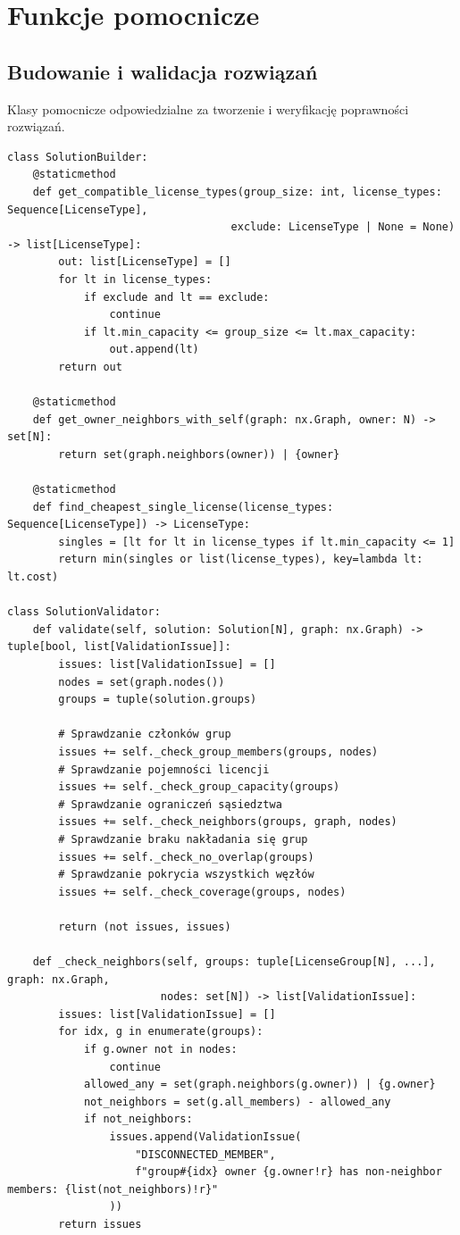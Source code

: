 \section{Funkcje pomocnicze}
\subsection{Budowanie i walidacja rozwiązań}
Klasy pomocnicze odpowiedzialne za tworzenie i weryfikację poprawności rozwiązań.

{\footnotesize
\begin{verbatim}
class SolutionBuilder:
    @staticmethod
    def get_compatible_license_types(group_size: int, license_types: Sequence[LicenseType],
                                   exclude: LicenseType | None = None) -> list[LicenseType]:
        out: list[LicenseType] = []
        for lt in license_types:
            if exclude and lt == exclude:
                continue
            if lt.min_capacity <= group_size <= lt.max_capacity:
                out.append(lt)
        return out

    @staticmethod
    def get_owner_neighbors_with_self(graph: nx.Graph, owner: N) -> set[N]:
        return set(graph.neighbors(owner)) | {owner}

    @staticmethod
    def find_cheapest_single_license(license_types: Sequence[LicenseType]) -> LicenseType:
        singles = [lt for lt in license_types if lt.min_capacity <= 1]
        return min(singles or list(license_types), key=lambda lt: lt.cost)

class SolutionValidator:
    def validate(self, solution: Solution[N], graph: nx.Graph) -> tuple[bool, list[ValidationIssue]]:
        issues: list[ValidationIssue] = []
        nodes = set(graph.nodes())
        groups = tuple(solution.groups)

        # Sprawdzanie członków grup
        issues += self._check_group_members(groups, nodes)
        # Sprawdzanie pojemności licencji
        issues += self._check_group_capacity(groups)
        # Sprawdzanie ograniczeń sąsiedztwa
        issues += self._check_neighbors(groups, graph, nodes)
        # Sprawdzanie braku nakładania się grup
        issues += self._check_no_overlap(groups)
        # Sprawdzanie pokrycia wszystkich węzłów
        issues += self._check_coverage(groups, nodes)

        return (not issues, issues)

    def _check_neighbors(self, groups: tuple[LicenseGroup[N], ...], graph: nx.Graph,
                        nodes: set[N]) -> list[ValidationIssue]:
        issues: list[ValidationIssue] = []
        for idx, g in enumerate(groups):
            if g.owner not in nodes:
                continue
            allowed_any = set(graph.neighbors(g.owner)) | {g.owner}
            not_neighbors = set(g.all_members) - allowed_any
            if not_neighbors:
                issues.append(ValidationIssue(
                    "DISCONNECTED_MEMBER",
                    f"group#{idx} owner {g.owner!r} has non-neighbor members: {list(not_neighbors)!r}"
                ))
        return issues


\end{verbatim}}
